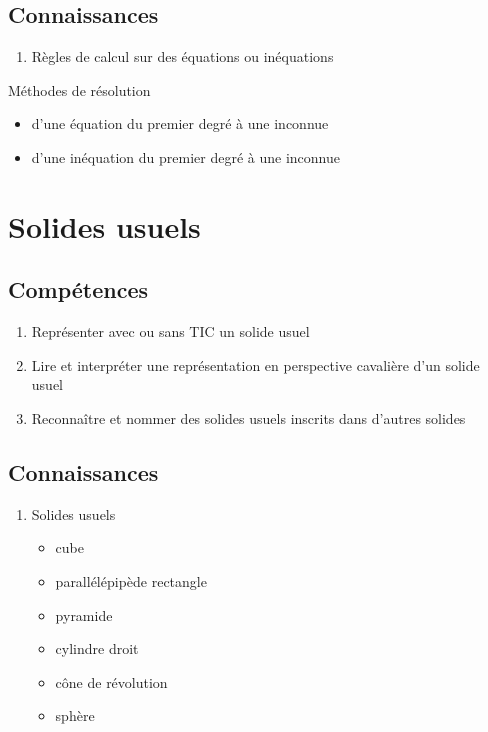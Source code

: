 \documentclass[12pt,a4paper]{article}
\begin{document}
\subsection*{Connaissances}
\begin{enumerate}
	\item Règles de calcul sur des équations ou inéquations
\end{enumerate}
Méthodes de résolution
\begin{itemize}
	\item d'une équation du premier degré à une inconnue
	\item d'une inéquation du premier degré à une inconnue
	
\end{itemize}

\section{Solides usuels}
\subsection*{Compétences}
\begin{enumerate}
	\item Représenter avec ou sans TIC un solide usuel
	\item Lire et interpréter une représentation en perspective cavalière d'un solide usuel
	\item Reconnaître et nommer des solides usuels inscrits dans d'autres solides
\end{enumerate}

\subsection*{Connaissances}

\begin{enumerate}
	\item Solides usuels
	\begin{itemize}
		\item cube
		\item parallélépipède rectangle
		\item pyramide
		\item cylindre droit
		\item cône de révolution
		\item sphère
	\end{itemize}
\end{enumerate}
\end{document}
